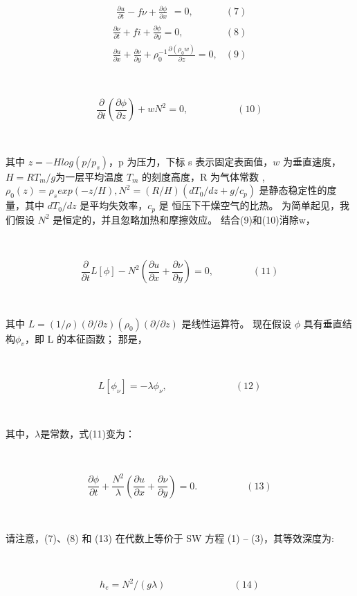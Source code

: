 \documentclass{article}
\begin{document}
\begin{CJK*}{UTF8}{gbsn}
\ 

\[\begin{aligned}
\begin{aligned}\frac{\partial u}{\partial t}-f\nu+\frac{\partial\phi}{\partial x}\end{aligned} =0, & \left(7\right)  \\
\frac{\partial\nu}{\partial t}+\textit{fi}+\frac{\partial\phi}{\partial y} =0, & \left(8\right)  \\
\frac{\partial u}{\partial x}+\frac{\partial\nu}{\partial y}+\rho_0^{-1}\frac{\partial(\rho_0w)}{\partial z}=0,& \left(9\right) 
\end{aligned}\]


\ 

\[\frac\partial{\partial t}\left(\frac{\partial\phi}{\partial z}\right)+wN^2=0,\quad\quad\quad\quad\quad(10)\]


\ 

其中 $z=-Hlog(p/p_s)$，p 为压力，下标 s 表示固定表面值，$w$ 为垂直速度，$H = RT_m/g $为一层平均温度 $T_m$ 的刻度高度，R 为气体常数 , $\rho_0(z)  = \rho_s exp(-z /H) , N^2 = (R/H)(dT_0 /dz+g/c_p)$ 是静态稳定性的度量，其中 $dT_0/dz$ 是平均失效率，$c_p$ 是 恒压下干燥空气的比热。 为简单起见，我们假设 $N^2$ 是恒定的，并且忽略加热和摩擦效应。 结合(9)和(10)消除w，


\ 

\[\frac\partial{\partial t}L[\phi]-N^2\left(\frac{\partial u}{\partial x}+\frac{\partial\nu}{\partial y}\right)=0,\quad\quad\quad\quad(11)\]


\ 

其中 $L=(1/\rho)(\partial /\partial z)(\rho_0)(\partial / \partial z)$ 是线性运算符。 现在假设 $\phi$ 具有垂直结构$\phi_v$，即 L 的本征函数； 那是，


\ 


\[L[\phi_{\nu}]=-\lambda\phi_{\nu},\quad\quad\quad\quad\quad\quad\quad(12)\]

\ 


其中，$\lambda$是常数，式(11)变为：


\ 


\[\frac{\partial\phi}{\partial t}+\frac{N^2}\lambda\left(\frac{\partial u}{\partial x}+\frac{\partial\nu}{\partial y}\right)=0.\quad\quad\quad\quad\quad(13)\]


\ 

请注意，(7)、(8) 和 (13) 在代数上等价于 SW 方程 (1) – (3)，其等效深度为:



\ 

\[h_e=N^2/(g\lambda)\quad\quad\quad\quad\quad\quad\quad(14)\]



\end{CJK*}
\end{document}
